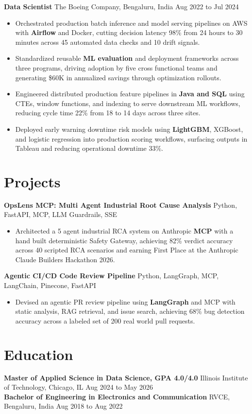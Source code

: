\documentclass[letterpaper,10pt]{article}
\newcommand{\resumeItem}[1]{\item\small{#1}}
\begin{document}
\textbf{Data Scientist} \hfill The Boeing Company, Bengaluru, India \hfill Aug 2022 to Jul 2024
\begin{itemize}[leftmargin=0.15in]
  \resumeItem{Orchestrated production batch inference and model serving pipelines on AWS with \textbf{Airflow} and Docker, cutting decision latency 98\% from 24 hours to 30 minutes across 45 automated data checks and 10 drift signals.}
  \resumeItem{Standardized reusable \textbf{ML evaluation} and deployment frameworks across three programs, driving adoption by five cross functional teams and generating \$60K in annualized savings through optimization rollouts.}
  \resumeItem{Engineered distributed production feature pipelines in \textbf{Java and SQL} using CTEs, window functions, and indexing to serve downstream ML workflows, reducing cycle time 22\% from 18 to 14 days across three sites.}
  \resumeItem{Deployed early warning downtime risk models using \textbf{LightGBM}, XGBoost, and logistic regression into production scoring workflows, surfacing outputs in Tableau and reducing operational downtime 33\%.}
\end{itemize}

\section*{Projects}
\textbf{OpsLens MCP: Multi Agent Industrial Root Cause Analysis} \hfill Python, FastAPI, MCP, LLM Guardrails, SSE
\begin{itemize}[leftmargin=0.15in]
  \resumeItem{Architected a 5 agent industrial RCA system on Anthropic \textbf{MCP} with a hand built deterministic Safety Gateway, achieving 82\% verdict accuracy across 40 scripted RCA scenarios and earning First Place at the Anthropic Claude Builders Hackathon 2026.}
\end{itemize}
\textbf{Agentic CI/CD Code Review Pipeline} \hfill Python, LangGraph, MCP, LangChain, Pinecone, FastAPI
\begin{itemize}[leftmargin=0.15in]
  \resumeItem{Devised an agentic PR review pipeline using \textbf{LangGraph} and MCP with static analysis, RAG retrieval, and issue search, achieving 68\% bug detection accuracy across a labeled set of 200 real world pull requests.}
\end{itemize}

\section*{Education}
\textbf{Master of Applied Science in Data Science, GPA 4.0/4.0} \hfill Illinois Institute of Technology, Chicago, IL \hfill Aug 2024 to May 2026 \\
\textbf{Bachelor of Engineering in Electronics and Communication} \hfill RVCE, Bengaluru, India \hfill Aug 2018 to Aug 2022
\end{document}
